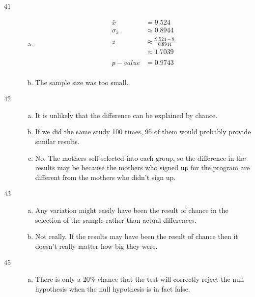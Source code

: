 \documentclass[letterpaper]{exam}
\begin{document}
\begin{description}
      \item[41] 
        \begin{enumerate}[(a)]
          \item 
            \begin{align*}
              \bar{x}          & = 9.524 \\
              \sigma_{\bar{x}} & \approx 0.8944 \\
              z                & \approx \frac{9.524 - 8}{0.8944} \\
                               & \approx 1.7039 \\
              \\
              p-value          & = 0.9743 \\
            \end{align*}

          \item The sample size was too small.
        \end{enumerate}

      \item[42] 
        \begin{enumerate}[(a)]
          \item It is unlikely that the difference can be explained by chance.

          \item If we did the same study 100 times, 95 of them would probably
            provide similar results.

          \item No. The mothers self-selected into each group, so the difference
            in the results may be because the mothers who signed up for the
            program are different from the mothers who didn't sign up.
        \end{enumerate}
        
      \item[43]
        \begin{enumerate}[(a)]
          \item Any variation might easily have been the result of chance in the
            selection of the sample rather than actual differences.

          \item Not really. If the results may have been the result of chance
            then it doesn't really matter how big they were.
        \end{enumerate}

      \item[45]
        \begin{enumerate}[(a)]
          \item There is only a 20\% chance that the test will correctly reject the
            null hypothesis when the null hypothesis is in fact false.


\end{enumerate}
\end{description}
\end{document}
